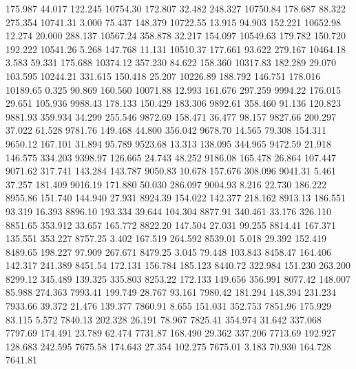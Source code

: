  175.987   44.017  122.245     10754.30
 172.807   32.482  248.327     10750.84
 178.687   88.322  275.354     10741.31
   3.000   75.437  148.379     10722.55
  13.915   94.903  152.221     10652.98
  12.274   20.000  288.137     10567.24
 358.878   32.217  154.097     10549.63
 179.782  150.720  192.222     10541.26
   5.268  147.768   11.131     10510.37
 177.661   93.622  279.167     10464.18
   3.583   59.331  175.688     10374.12
 357.230   84.622  158.360     10317.83
 182.289   29.070  103.595     10244.21
 331.615  150.418   25.207     10226.89
 188.792  146.751  178.016     10189.65
   0.325   90.869  160.560     10071.88
  12.993  161.676  297.259      9994.22
 176.015   29.651  105.936      9988.43
 178.133  150.429  183.306      9892.61
 358.460   91.136  120.823      9881.93
 359.934   34.299  255.546      9872.69
 158.471   36.477   98.157      9827.66
 200.297   37.022   61.528      9781.76
 149.468   44.800  356.042      9678.70
  14.565   79.308  154.311      9650.12
 167.101   31.894   95.789      9523.68
  13.313  138.095  344.965      9472.59
  21.918  146.575  334.203      9398.97
 126.665   24.743   48.252      9186.08
 165.478   26.864  107.447      9071.62
 317.741  143.284  143.787      9050.83
  10.678  157.676  308.096      9041.31
   5.461   37.257  181.409      9016.19
 171.880   50.030  286.097      9004.93
   8.216   22.730  186.222      8955.86
 151.740  144.940   27.931      8924.39
 154.022  142.377  218.162      8913.13
 186.551   93.319   16.393      8896.10
 193.334   39.644  104.304      8877.91
 340.461   33.176  326.110      8851.65
 353.912   33.657  165.772      8822.20
 147.504   27.031   99.255      8814.41
 167.371  135.551  353.227      8757.25
   3.402  167.519  264.592      8539.01
   5.018   29.392  152.419      8489.65
 198.227   97.909  267.671      8479.25
   3.045   79.448  103.843      8458.47
 164.406  142.317  241.389      8451.54
 172.131  156.784  185.123      8440.72
 322.984  151.230  263.200      8299.12
 345.489  139.325  335.803      8253.22
 172.133  149.656  356.991      8077.42
 148.007   85.988  274.363      7993.41
 199.749   28.767   93.161      7980.42
 181.294  148.394  231.234      7933.66
  39.372   21.476  139.377      7860.91
   8.655  151.031  352.753      7851.96
 175.929   83.115    5.572      7840.13
 202.328   26.191   78.967      7825.41
 354.974   31.642  337.068      7797.69
 174.491   23.789   62.474      7731.87
 168.490   29.362  337.206      7713.69
 192.927  128.683  242.595      7675.58
 174.643   27.354  102.275      7675.01
   3.183   70.930  164.728      7641.81
